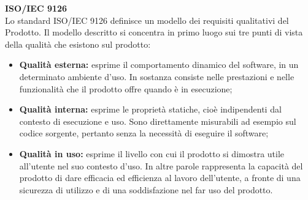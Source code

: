 \documentclass[11pt,a4paper]{article}
\begin{document}
{\textbf{ISO/IEC 9126} \\
Lo standard ISO/IEC 9126 definisce un modello dei requisiti qualitativi del Prodotto.
Il modello descritto si concentra in primo luogo sui tre punti di vista della qualità che esistono sul prodotto:
\begin{itemize}
	\item \textbf{Qualità esterna:} esprime il comportamento dinamico del software, in un determinato ambiente d'uso. In sostanza consiste nelle prestazioni e nelle funzionalità che il prodotto offre quando è in esecuzione;
	\item \textbf{Qualità interna:} esprime le proprietà statiche, cioè
	indipendenti dal contesto di esecuzione e uso. Sono direttamente misurabili ad esempio sul
	codice sorgente, pertanto senza la necessità di eseguire il software;
	\item \textbf{Qualità in uso:} esprime il livello con cui il prodotto si dimostra utile all'utente nel suo contesto d'uso. In altre parole rappresenta la capacità del prodotto di dare efficacia ed efficienza al lavoro dell'utente, a fronte di una sicurezza di utilizzo e di una soddisfazione nel far uso del prodotto.
\end{itemize}
}
\end{document}
